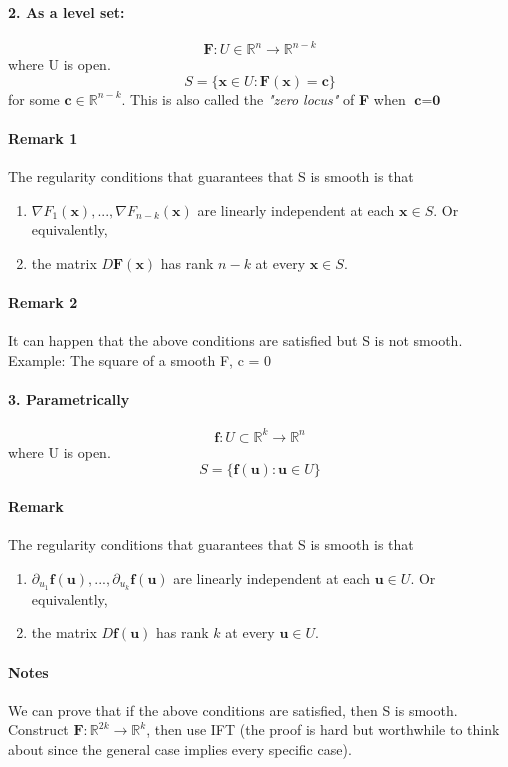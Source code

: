 \documentclass[11pt]{article}
\newcommand{\ti}[1]{\textit{#1}}
\newcommand{\tb}[1]{\textbf{#1}}
\newcommand{\real}[0]{\mathbb{R}}
\newcommand{\func}[3]{\tb{#1}: {#2} \rightarrow {#3} }
\begin{document}
\paragraph{2. As a \tb{level set}:}
    $$ \func{F}{U\in \real^n}{\real^{n-k}}$$ where U is open.
    $$ S = \{\tb{x} \in U: \tb{F}(\tb{x}) = \tb{c}\}$$ for some $\tb{c} \in \real^{n-k}$.\newline
    This is also called the \ti{"zero locus"} of \tb{F} when $\tb{c} = \tb{0}$
\paragraph{Remark 1} The regularity conditions that guarantees that S is smooth is that
\begin{enumerate}
    \item $\nabla F_1(\tb{x}), ..., \nabla F_{n-k}(\tb{x})$ are linearly independent at each $\tb{x} \in S$. Or equivalently,
    \item the matrix $D\tb{F}(\tb{x})$ has rank $n-k$ at every $\tb{x} \in S$.
\end{enumerate}
\paragraph{Remark 2} It can happen that the above conditions are satisfied but S is not smooth. Example: The square of a smooth F, c = 0
\paragraph{3. Parametrically}
$$\func{f}{U \subset \real^k}{\real^{n}}$$ where U is open.
$$ S = \{\tb{f}(\tb{u}): \tb{u} \in U\}$$
\paragraph{Remark} The regularity conditions that guarantees that S is smooth is that
\begin{enumerate}
    \item $\partial_{u_1}\tb{f}(\tb{u}),...,\partial_{u_k}\tb{f}(\tb{u})$ are linearly independent at each $\tb{u} \in U$. Or equivalently,
    \item the matrix $D\tb{f}(\tb{u})$ has rank $k$ at every $\tb{u} \in U$.
\end{enumerate}
\paragraph{Notes} We can prove that if the above conditions are satisfied, then S is smooth. Construct $\func{F}{\real^{2k}}{\real^k}$, then use IFT (the proof is hard but worthwhile to think about since the general case implies every specific case).
\end{document}
